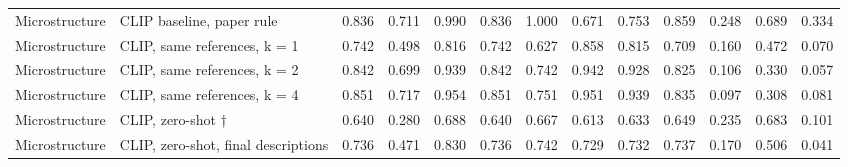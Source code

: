 \begin{table}
\begin{tabular}[t]{llrrrrrrrrrrr}
Microstructure & CLIP baseline, paper rule & 0.836 & 0.711 & 0.990 & 0.836 & 1.000 & 0.671 & 0.753 & 0.859 & 0.248 & 0.689 & 0.334\\
Microstructure & CLIP, same references, k = 1 & 0.742 & 0.498 & 0.816 & 0.742 & 0.627 & 0.858 & 0.815 & 0.709 & 0.160 & 0.472 & 0.070\\
\addlinespace
Microstructure & CLIP, same references, k = 2 & 0.842 & 0.699 & 0.939 & 0.842 & 0.742 & 0.942 & 0.928 & 0.825 & 0.106 & 0.330 & 0.057\\
Microstructure & CLIP, same references, k = 4 & 0.851 & 0.717 & 0.954 & 0.851 & 0.751 & 0.951 & 0.939 & 0.835 & 0.097 & 0.308 & 0.081\\
Microstructure & CLIP, zero-shot † & 0.640 & 0.280 & 0.688 & 0.640 & 0.667 & 0.613 & 0.633 & 0.649 & 0.235 & 0.683 & 0.101\\
Microstructure & CLIP, zero-shot, final descriptions & 0.736 & 0.471 & 0.830 & 0.736 & 0.742 & 0.729 & 0.732 & 0.737 & 0.170 & 0.506 & 0.041\\
\bottomrule
\end{tabular}
\end{table}
